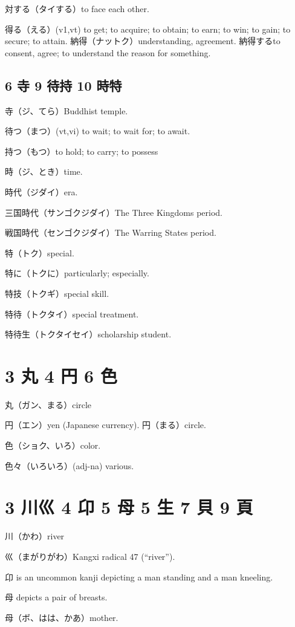 対する（タイする）to face each other.

得る（える）(v1,vt) to get; to acquire; to obtain; to earn; to win; to gain; to secure; to attain.
納得（ナットク）understanding, agreement.
納得するto consent, agree; to understand the reason for something.

\subsection{6 寺 9 待持 10 時特}

寺（ジ、てら）Buddhist temple.

待つ（まつ）(vt,vi) to wait; to wait for; to await.

持つ（もつ）to hold; to carry; to possess

時（ジ、とき）time.

時代（ジダイ）era.

三国時代（サンゴクジダイ）The Three Kingdoms period.

戦国時代（センゴクジダイ）The Warring States period.

特（トク）special.

特に（トクに）particularly; especially.

特技（トクギ）special skill.

特待（トクタイ）special treatment.

特待生（トクタイセイ）scholarship student.

\section{3 丸 4 円 6 色}

丸（ガン、まる）circle

円（エン）yen (Japanese currency).
円（まる）circle.

色（ショク、いろ）color.

色々（いろいろ）(adj-na) various.

\section{3 川巛 4 卬 5 母 5 生 7 貝 9 頁}

川（かわ）river

巛（まがりがわ）Kangxi radical 47 (``river'').

卬 is an uncommon kanji depicting a man standing and a man kneeling.

母 depicts a pair of breasts.

母（ボ、はは、かあ）mother.


